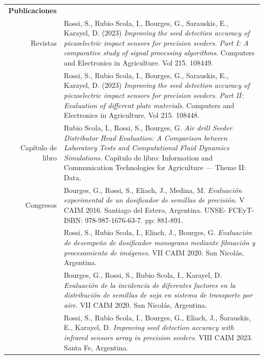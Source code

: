 \documentclass[a4paper,10pt, sans]{article}
\begin{document}
\begin{table}[H]
\begin{tabularx}{\textwidth}{r X}
    \textbf{Publicaciones } & {} \\ [1ex]
    {Revistas} & {Rossi, S., Rubio Scola, I., Bourges, G., Sarauskis, E., Karayel, D. (2023) \textit{Improving the seed detection accuracy of piezoelectric impact sensors for precision seeders. Part I: A comparative study of signal processing algorithms}. Computers and Electronics in Agriculture. Vol 215. 108449.} \\ [1ex]
      {} & {Rossi, S., Rubio Scola, I., Bourges, G., Sarauskis, E., Karayel, D. (2023) \textit{Improving the seed detection accuracy of piezoelectric impact sensors for precision seeders. Part II: Evaluation of different plate materials}. Computers and Electronics in Agriculture. Vol 215. 108448.} \\ [1ex]
    {Capítulo de libro} & Rubio Scola, I., Rossi, S., Bourges, G. \textit{Air drill Seeder Distributor Head Evaluation: A Comparison between Laboratory Tests and Computational Fluid Dynamics Simulations.} Capítulo de libro: Information and Communication Technologies for Agriculture — Theme II: Data. \\ [1ex]
    Congresos & Bourges, G., Rossi, S., Eliach, J., Medina, M. \textit{Evaluación experimental de un dosificador de semillas de precisión.} V CAIM 2016. Santiago del Estero, Argentina. UNSE- FCEyT- ISBN: 978-987-1676-63-7. pp: 881-891. \\  [1ex]
      {} & Rossi, S., Rubio Scola, I., Eliach, J., Bourges, G. \textit{Evaluación de desempeño de dosificador monograno mediante filmación y procesamiento de imágenes.} VII CAIM 2020. San Nicolás, Argentina. \\  [1ex]
      {} & Bourges, G., Rossi, S., Rubio Scola, I., Karayel, D. \textit{Evaluación de la incidencia de diferentes factores en la distribución de semillas de soja en sistema de transporte por aire.} VII CAIM 2020. San Nicolás, Argentina. \\  [1ex]
      {} & Rossi, S., Rubio Scola, I., Bourges, G., Eliach, J., Šarauskis, E., Karayel, D. \textit{Improving seed detection accuracy with infrared sensors array in precision seeders}. VIII CAIM 2023. Santa Fe, Argentina. \\  [1ex]
     
  \end{tabularx}
  \end{table}
\end{document}
